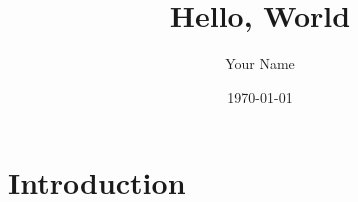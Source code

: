 

\title{Hello, World}
\author{Your Name}
\date{\today{}}



\maketitle

\section{Introduction}

% 
% 


